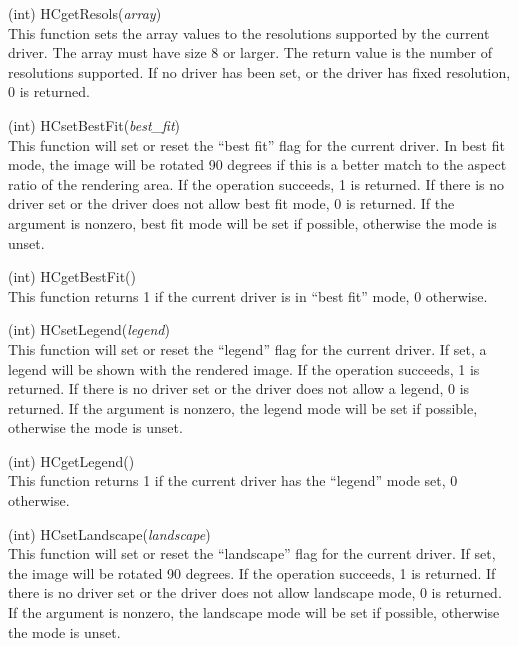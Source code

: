 \begin{description}
\item{(int) \vt HCgetResols({\it array\/})}\\
This function sets the array values to the resolutions supported by
the current driver.  The array must have size 8 or larger.  The return
value is the number of resolutions supported.  If no driver has been
set, or the driver has fixed resolution, 0 is returned.

\item{(int) \vt HCsetBestFit({\it best\_fit\/})}\\
This function will set or reset the ``best fit'' flag for the current
driver.  In best fit mode, the image will be rotated 90 degrees if
this is a better match to the aspect ratio of the rendering area.  If
the operation succeeds, 1 is returned.  If there is no driver set or
the driver does not allow best fit mode, 0 is returned.  If the
argument is nonzero, best fit mode will be set if possible, otherwise
the mode is unset.

\item{(int) \vt HCgetBestFit()}\\
This function returns 1 if the current driver is in ``best fit'' mode,
0 otherwise.

\item{(int) \vt HCsetLegend({\it legend\/})}\\
This function will set or reset the ``legend'' flag for the current
driver.  If set, a legend will be shown with the rendered image.  If
the operation succeeds, 1 is returned.  If there is no driver set or
the driver does not allow a legend, 0 is returned.  If the argument is
nonzero, the legend mode will be set if possible, otherwise the mode
is unset.

\item{(int) \vt HCgetLegend()}\\
This function returns 1 if the current driver has the ``legend'' mode
set, 0 otherwise.

\item{(int) \vt HCsetLandscape({\it landscape\/})}\\
This function will set or reset the ``landscape'' flag for the current
driver.  If set, the image will be rotated 90 degrees.  If the
operation succeeds, 1 is returned.  If there is no driver set or the
driver does not allow landscape mode, 0 is returned.  If the argument
is nonzero, the landscape mode will be set if possible, otherwise the
mode is unset.


\end{description}
